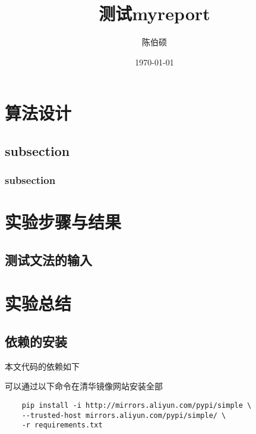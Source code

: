 \documentclass[pdfCover]{myreport} %
\title{测试myreport}
\author{陈伯硕}
\date{\today}
\begin{document}
\maketitle
\pagestyle{empty}

\setcounter{section}{3}
\section{算法设计}
\subsection{subsection}
\subsubsection{subsection}

\section{实验步骤与结果}
  \subsection{测试文法的输入}
    

\section{实验总结}
  


\nocite{alfred_v_aho_compilers_2006}



\begin{appendices}
  \section{依赖的安装}
    本文代码的依赖如下
    
    可以通过以下命令在清华镜像网站安装全部
    \begin{lstlisting}
    pip install -i http://mirrors.aliyun.com/pypi/simple \
    --trusted-host mirrors.aliyun.com/pypi/simple/ \
    -r requirements.txt
    \end{lstlisting}

\end{appendices}
\end{document}
